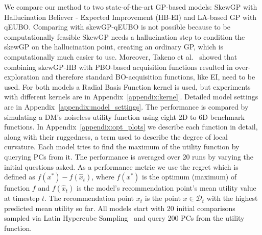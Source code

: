 \documentclass{article}
\begin{document}
We compare our method to two state-of-the-art GP-based models: SkewGP with Hallucination Believer - Expected Improvement (HB-EI) and LA-based GP with qEUBO. Comparing with skewGP-qEUBO is not possible because to be computationally feasible SkewGP needs a hallucination step to condition the skewGP on the hallucination point, creating an ordinary GP, which is computationally much easier to use. Moreover, Takeno et al.~\cite{takeno2023towards} showed that combining skewGP-HB with PBO-based acquisition functions resulted in over-exploration and therefore standard BO-acquisition functions, like EI, need to be used. For both models a Radial Basis Function kernel is used, but experiments with different kernels are in Appendix~\ref{appendix:kernel}. Detailed model settings are in Appendix~\ref{appendix:model_settings}. The performance is compared by simulating a DM's noiseless utility function using eight 2D to 6D benchmark functions. In Appendix~\ref{appendix:opt_plots} we describe each function in detail, along with their ruggedness, a term used to describe the degree of local curvature.
Each model tries to find the maximum of the utility function by querying PCs from it. The performance is averaged over 20 runs by varying the initial questions asked. As a performance metric we use the regret which is defined as $f(x^*) - f(\hat{x}_t)$, where $f(x^*)$ is the optimum (maximum) of function $f$ and $f(\hat{x}_t)$ is the model's recommendation point's mean utility value at timestep $t$. The recommendation point $x_t$ is the point $x \in \mathcal{D}_t$ with the highest predicted mean utility so far. All models start with 20 initial comparisons sampled via Latin Hypercube Sampling~\cite{mckay1979lhs} and query 200 PCs from the utility function.

\end{document}
